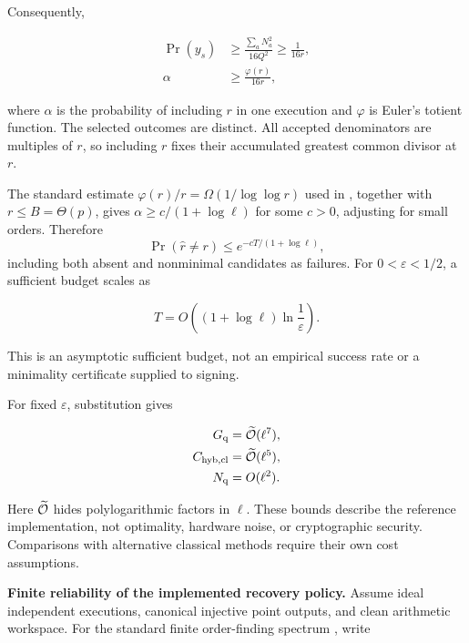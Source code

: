 \begin{revision}
Consequently,

\begin{equation}
    \label{eq:app_r6_success_lower_bound}
    \begin{aligned}
        \Pr(y_s)&\geq\frac{\sum_aN_a^2}{16Q^2}
        \geq\frac{1}{16r},\\
        \alpha&\geq\frac{\varphi(r)}{16r},
    \end{aligned}
\end{equation}

where $\alpha$ is the probability of including $r$ in one execution and $\varphi$ is Euler's totient function. The selected outcomes are distinct. All accepted denominators are multiples of $r$, so including $r$ fixes their accumulated greatest common divisor at $r$.

The standard estimate $\varphi(r)/r=\Omega(1/\log\log r)$ used in \cite{Shor1997}, together with $r\leq B=\Theta(p)$, gives $\alpha\geq c/(1+\log\ell)$ for some $c>0$, adjusting for small orders. Therefore
\[
        \Pr(\hat r\neq r)
    \leq e^{-cT/(1+\log\ell)},
\]
including both absent and nonminimal candidates as failures. For $0<\varepsilon<1/2$, a sufficient budget scales as 

\begin{equation}
    \label{eq:app_r6_measurement_budget}
    T=O\!\left((1+\log\ell)\ln\frac{1}{\varepsilon}\right).
\end{equation}

This is an asymptotic sufficient budget, not an empirical success rate or a minimality certificate supplied to signing.

For fixed $\varepsilon$, substitution gives

\begin{equation}
    \label{eq:app_r6_total_confidence_bounds}
    \begin{aligned}
        G_{\mathrm q}&=\widetilde{\mathcal{O}}(\ell^7),\\
        C_{\mathrm{hyb,cl}}&=\widetilde{\mathcal{O}}(\ell^5),\\
        N_{\mathrm q}&=O(\ell^2).
    \end{aligned}
\end{equation}

Here $\widetilde{\mathcal{O}}$ hides polylogarithmic factors in $\ell$. These bounds describe the reference implementation, not optimality, hardware noise, or cryptographic security. Comparisons with alternative classical methods require their own cost assumptions.

\textbf{Finite reliability of the implemented recovery policy.} Assume ideal independent executions, canonical injective point outputs, and clean arithmetic workspace. For the standard finite order-finding spectrum \cite{Shor1997,Ekera2022OrderFinding}, write 


\end{revision}
